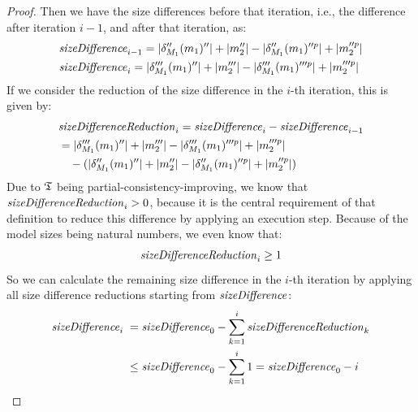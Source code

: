 \begin{proof}
    Then we have the size differences before that iteration, i.e., the difference after iteration $i-1$, and after that iteration, as:
    \begin{align*}
        &
        \mathit{sizeDifference}_{i-1} = \lvert\delta_{M_{1}}''(m_{1})''\rvert + \lvert m_{2}''\rvert - \lvert\delta_{M_{1}}''(m_{1})''^p\rvert + \lvert m_{2}''^p\rvert \\
        &
        \mathit{sizeDifference}_{i} = \lvert\delta_{M_{1}}'''(m_{1})''\rvert + \lvert m_{2}'''\rvert - \lvert\delta_{M_{1}}'''(m_{1})'''^p\rvert + \lvert m_{2}'''^p\rvert
    \end{align*}
    If we consider the reduction of the size difference in the $i$-th iteration, this is given by:
    \begin{align*}
        & 
        \mathit{sizeDifferenceReduction}_{i} = \mathit{sizeDifference}_{i} - \mathit{sizeDifference}_{i-1} \\
        & 
        = \lvert\delta_{M_{1}}'''(m_{1})''\rvert + \lvert m_{2}'''\rvert - \lvert\delta_{M_{1}}'''(m_{1})'''^p\rvert + \lvert m_{2}'''^p\rvert \\
        & \hspace{1em}
        - (\lvert\delta_{M_{1}}''(m_{1})''\rvert + \lvert m_{2}''\rvert - \lvert\delta_{M_{1}}''(m_{1})''^p\rvert + \lvert m_{2}''^p\rvert)
    \end{align*}
    Due to $\mathfrak{T}$ being partial-consistency-improving, we know that $\mathit{sizeDifferenceReduction}_{i} > 0$, because it is the central requirement of that definition to reduce this difference by applying an execution step. 
    Because of the model sizes being natural numbers, we even know that:
    \begin{align*}
        \mathit{sizeDifferenceReduction}_{i} \geq 1
    \end{align*}
    So we can calculate the remaining size difference in the $i$-th iteration by applying all size difference reductions starting from $\mathit{sizeDifference}$:
    \begin{align*}
        \mathit{sizeDifference}_{i} \; & 
        =  \mathit{sizeDifference}_{0} - \sum_{k=1}^{i} \mathit{sizeDifferenceReduction}_{k} \\
        &
        \leq \mathit{sizeDifference}_{0} - \sum_{k=1}^{i} 1 = \mathit{sizeDifference}_{0} - i
    \end{align*}

\end{proof}

